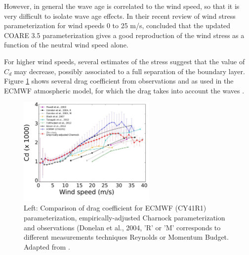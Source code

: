 
However, in general the wave age is correlated to the wind speed, so that it is very difficult to isolate wave age effects. In their recent review of wind stress parameterization for wind speeds 0 to 25 m/s, \cite{Edson&al.2013} concluded that the updated COARE 3.5 parameterization gives a good reproduction of the wind stress as a function of the neutral wind speed alone. 

For higher wind speeds, several estimates of the stress suggest that the value of $C_d$ may decrease, possibly associated to a full separation of the boundary layer. Figure \ref{Lucia2017} shows several drag coefficient from observations and as used in the ECMWF atmospheric model, for which the drag takes into account the waves \citep{Janssen2004}. %
\begin{figure}[h]
\centerline{\includegraphics[width=0.6\textwidth]{FIGS_CH_AIRSEA/High_drag_coeff.pdf}}
  \caption{Left: Comparison of drag coefficient for ECMWF (CY41R1) parameterization, empirically-adjusted Charnock parameterization and observations (Donelan et al., 2004, 'R' or 'M' corresponds to different measurements techniques Reynolds or Momentum Budget. %
  Adapted from \cite{Pineau-Guillou&al.2018}.}
\label{Lucia2017}
\end{figure}

